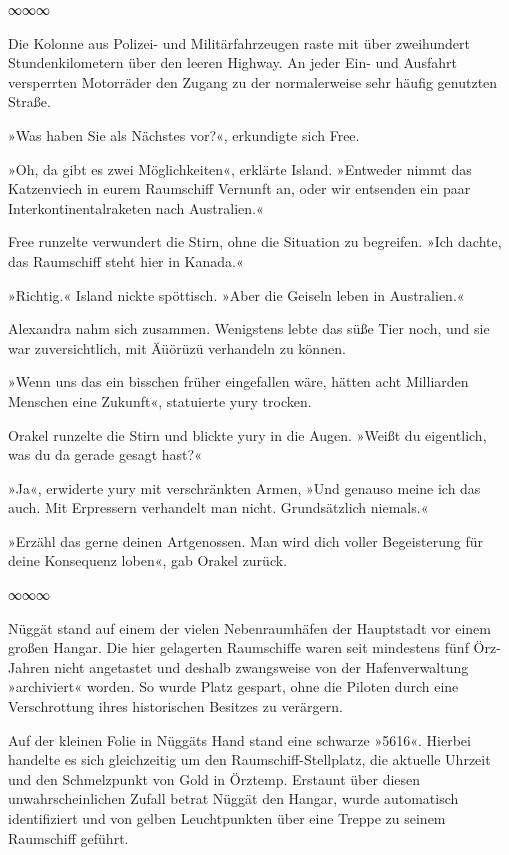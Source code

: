 \begin{center}
∞∞∞
\end{center}

Die Kolonne aus Polizei- und Militärfahrzeugen raste mit über zweihundert Stundenkilometern über den leeren Highway. An jeder Ein- und Ausfahrt versperrten Motorräder den Zugang zu der normalerweise sehr häufig genutzten Straße.

»Was haben Sie als Nächstes vor?«, erkundigte sich Free.

»Oh, da gibt es zwei Möglichkeiten«, erklärte Island. »Entweder nimmt das Katzenviech in eurem Raumschiff Vernunft an, oder wir entsenden ein paar Interkontinentalraketen nach Australien.«

Free runzelte verwundert die Stirn, ohne die Situation zu begreifen. »Ich dachte, das Raumschiff steht hier in Kanada.«

»Richtig.« Island nickte spöttisch. »Aber die Geiseln leben in Australien.«

Alexandra nahm sich zusammen. Wenigstens lebte das süße Tier noch, und sie war zuversichtlich, mit Äüörüzü verhandeln zu können.

»Wenn uns das ein bisschen früher eingefallen wäre, hätten acht Milliarden Menschen eine Zukunft«, statuierte yury trocken.

Orakel runzelte die Stirn und blickte yury in die Augen. »Weißt du eigentlich, was du da gerade gesagt hast?«

»Ja«, erwiderte yury mit verschränkten Armen, »Und genauso meine ich das auch. Mit Erpressern verhandelt man nicht. Grundsätzlich niemals.«

»Erzähl das gerne deinen Artgenossen. Man wird dich voller Begeisterung für deine Konsequenz loben«, gab Orakel zurück.

\begin{center}
∞∞∞
\end{center}

Nüggät stand auf einem der vielen Nebenraumhäfen der Hauptstadt vor einem großen Hangar. Die hier gelagerten Raumschiffe waren seit mindestens fünf Örz-Jahren nicht angetastet und deshalb zwangsweise von der Hafenverwaltung »archiviert« worden. So wurde Platz gespart, ohne die Piloten durch eine Verschrottung ihres historischen Besitzes zu verärgern.

Auf der kleinen Folie in Nüggäts Hand stand eine schwarze »5616«. Hierbei handelte es sich gleichzeitig um den Raumschiff-Stellplatz, die aktuelle Uhrzeit und den Schmelzpunkt von Gold in Örztemp. Erstaunt über diesen unwahrscheinlichen Zufall betrat Nüggät den Hangar, wurde automatisch identifiziert und von gelben Leuchtpunkten über eine Treppe zu seinem Raumschiff geführt.

